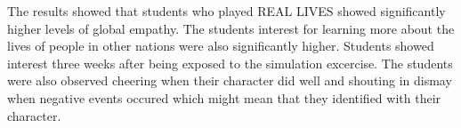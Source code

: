 The results showed that students who played REAL LIVES showed significantly higher levels of global empathy. The students interest for learning more about the lives of people in other nations were also significantly higher. Students showed interest three weeks after being exposed to the simulation excercise. The students were also observed cheering when their character did well and shouting in dismay when negative events occured which might mean that they identified with their character.

